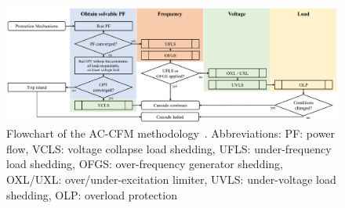 \begin{figure}
    \centering
    \includegraphics[width=\linewidth]{Figs/NoebelsFlowchart.png}
    \caption{Flowchart of the AC-CFM methodology~\cite{ManchesterNoebels}. Abbreviations: PF: power flow, VCLS: voltage collapse load shedding, UFLS: under-frequency load shedding, OFGS: over-frequency generator shedding, OXL/UXL: over/under-excitation limiter, UVLS: under-voltage load shedding, OLP: overload protection}
    \label{fig:NoebelsFlowchart}
\end{figure}


